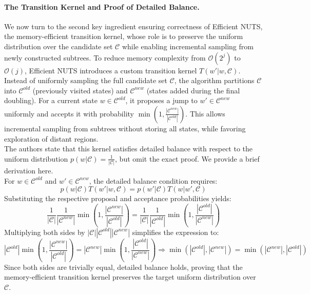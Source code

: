 \documentclass{article}
\begin{document}
\paragraph{The Transition Kernel and Proof of Detailed Balance.} We now turn to the second key ingredient ensuring correctness of Efficient NUTS, the memory-efficient transition kernel, whose role is to preserve the uniform distribution over the candidate set $\mathcal{C}$ while enabling incremental sampling from newly constructed subtrees.
To reduce memory complexity from $\mathcal{O}(2^j)$ to $\mathcal{O}(j)$, Efficient NUTS introduces a custom transition kernel $T(w'|w, \mathcal{C})$. Instead of uniformly sampling the full candidate set $\mathcal{C}$, the algorithm partitions $\mathcal{C}$ into $\mathcal{C}^{old}$ (previously visited states) and $\mathcal{C}^{new}$ (states added during the final doubling). For a current state $w \in \mathcal{C}^{old}$, it proposes a jump to $w' \in \mathcal{C}^{new}$ uniformly and accepts it with probability $\min\left(1, \frac{|\mathcal{C}^{new}|}{|\mathcal{C}^{old}|}\right)$. This allows incremental sampling from subtrees without storing all states, while favoring exploration of distant regions.\\
The authors state that this kernel satisfies detailed balance with respect to the uniform distribution $p(w|\mathcal{C}) = \frac{1}{|\mathcal{C}|}$, but omit the exact proof. We provide a brief derivation here. \\
For $w \in \mathcal{C}^{old}$ and $w' \in \mathcal{C}^{new}$, the detailed balance condition requires:
\begin{equation}
    p(w|\mathcal{C})T(w'|w, \mathcal{C}) = p(w'|\mathcal{C})T(w|w', \mathcal{C})
\end{equation}
Substituting the respective proposal and acceptance probabilities yields:
\begin{equation*}
    \frac{1}{|\mathcal{C}|} \frac{1}{|\mathcal{C}^{new}|} \min\left(1, \frac{|\mathcal{C}^{new}|}{|\mathcal{C}^{old}|}\right) = \frac{1}{|\mathcal{C}|} \frac{1}{|\mathcal{C}^{old}|} \min\left(1, \frac{|\mathcal{C}^{old}|}{|\mathcal{C}^{new}|}\right)
\end{equation*}
Multiplying both sides by $|\mathcal{C}| |\mathcal{C}^{old}| |\mathcal{C}^{new}|$ simplifies the expression to:
\begin{equation*}
    |\mathcal{C}^{old}| \min\left(1, \frac{|\mathcal{C}^{new}|}{|\mathcal{C}^{old}|}\right) = |\mathcal{C}^{new}| \min\left(1, \frac{|\mathcal{C}^{old}|}{|\mathcal{C}^{new}|}\right) \Rightarrow \min(|\mathcal{C}^{old}|, |\mathcal{C}^{new}|) = \min(|\mathcal{C}^{new}|, |\mathcal{C}^{old}|) 
\end{equation*}
Since both sides are trivially equal, detailed balance holds, proving that the memory-efficient transition kernel preserves the target uniform distribution over $\mathcal{C}$. 
\end{document}
